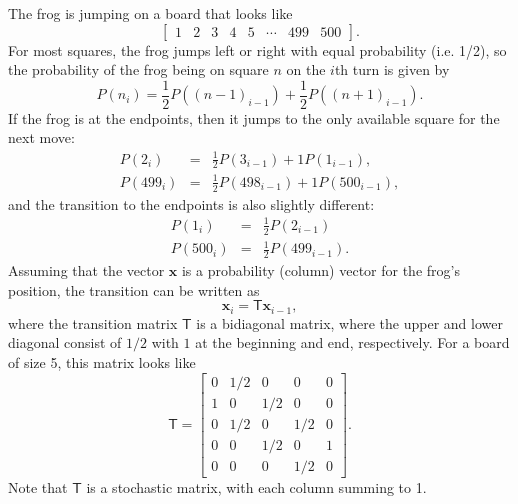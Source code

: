 \documentclass{article}
\begin{document}
The frog is jumping on a board that looks like
\begin{equation}
\left[ \begin{array}{cccccccc} 1 & 2 & 3 & 4 & 5 & \cdots & 499 & 500 \end{array} \right].
\end{equation}
For most squares, the frog jumps left or right with equal probability (i.e. 1/2), so the probability of the frog being on square $n$ on the $i$th turn is given by
\begin{equation}
	P(n_i) = \frac{1}{2}P((n-1)_{i-1}) + \frac{1}{2}P((n+1)_{i-1}).
\end{equation}
If the frog is at the endpoints, then it jumps to the only available square for the next move:
\begin{eqnarray}
	P(2_i) & = & \frac{1}{2}P(3_{i-1}) + 1P(1_{i-1}), \\
	P(499_i) & = & \frac{1}{2}P(498_{i-1}) + 1P(500_{i-1}),
\end{eqnarray}
and the transition to the endpoints is also slightly different:
\begin{eqnarray}
	P(1_i) & = & \frac{1}{2}P(2_{i-1}) \\
	P(500_i) & = & \frac{1}{2}P(499_{i-1}).
\end{eqnarray}
Assuming that the vector $\mathbf{x}$ is a probability (column) vector for the frog's position, the transition can be written as
\begin{equation}
	\mathbf{x}_i = \mathbf{\mathsf{T}}\mathbf{x}_{i-1},
\end{equation}
where the transition matrix $\mathbf{\mathsf{T}}$ is a bidiagonal matrix, where the upper and lower diagonal consist of $1/2$ with $1$ at the beginning and end, respectively.  For a board of size 5, this matrix looks like
\begin{equation}
	\mathbf{\mathsf{T}} = \left[
	\begin{array}{ccccc}
		0 & 1/2 & 0 & 0 & 0 \\
		1 & 0 & 1/2 & 0 & 0 \\
		0 & 1/2 & 0 & 1/2 & 0 \\
		0 & 0 & 1/2 & 0 & 1 \\
		0 & 0 & 0 & 1/2 & 0
	\end{array}
	\right].
\end{equation}
Note that $\mathbf{\mathsf{T}}$ is a stochastic matrix, with each column summing to 1.
\end{document}
